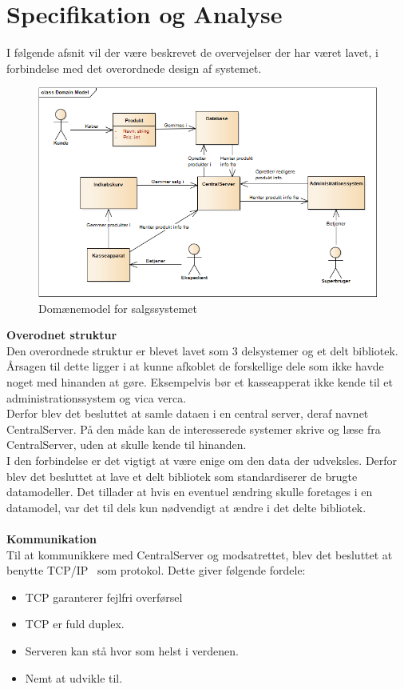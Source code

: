 \section{Specifikation og Analyse}

I følgende afsnit vil der være beskrevet de overvejelser der har været lavet, i forbindelse med det overordnede design af systemet.

\begin{figure}[H]
	\centering
	\includegraphics[width=1\textwidth]{Projektbeskrivelse/Images/DomainModel.png}
	\caption{Domænemodel for salgssystemet}
	\label{fig:domain}
\end{figure}


\textbf{Overodnet struktur}\\
Den overordnede struktur er blevet lavet som 3 delsystemer og et delt bibliotek. Årsagen til dette ligger i at kunne afkoblet de forskellige dele som ikke havde noget med hinanden at gøre. Eksempelvis bør et kasseapperat ikke kende til et administrationssystem og vica verca.\\
Derfor blev det besluttet at samle dataen i en central server, deraf navnet CentralServer. På den måde kan de interesserede systemer skrive og læse fra CentralServer, uden at skulle kende til hinanden.\\
I den forbindelse er det vigtigt at være enige om den data der udveksles. Derfor blev det besluttet at lave et delt bibliotek som standardiserer de brugte datamodeller. Det tillader at hvis en eventuel ændring skulle foretages i en datamodel, var det til dels kun nødvendigt at ændre i det delte bibliotek.\\
\\

\textbf{Kommunikation}\\
Til at kommunikkere med CentralServer og modsatrettet, blev det besluttet at benytte TCP/IP~\cite{tcpip} som protokol. Dette giver følgende fordele:

\begin{itemize}
	\item TCP garanterer fejlfri overførsel
	\item TCP er fuld duplex. 
	\item Serveren kan stå hvor som helst i verdenen.
	\item Nemt at udvikle til.
\end{itemize}

